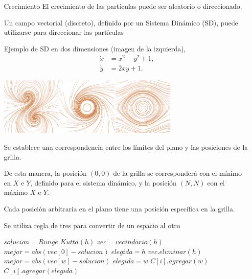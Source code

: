 \documentclass[spanish]{beamer}
\begin{document}
\begin{frame}{Crecimiento}
El crecimiento de las partículas puede ser aleatorio o direccionado.

Un campo vectorial (discreto), definido por un Sistema Dinámico (SD), puede utilizarse para direccionar las partículas 

Ejemplo de SD en dos dimensiones (imagen de la izquierda),
\begin{equation*} \label{eq:simple}  
  \begin{aligned}
    \dot{x} &= x^{2}-y^{2}+1,\\
    \dot{y} &= 2xy+1.
  \end{aligned}
\end{equation*}
  \centerline{\includegraphics[width=9cm]{../figures/Fig2}}
\end{frame}

\begin{frame}
Se establece una correspondencia entre los límites del plano y las posiciones de la grilla.

De esta manera, la posición $(0,0)$ de la grilla se corresponderá con el mínimo en $X$ e $Y$, definido para el sistema dinámico, y la posición $(N,N)$ con el máximo $X$ e $Y$.

Cada posición arbitraria en el plano tiene una posición específica en la grilla.

Se utiliza regla de tres para convertir de un espacio al otro

\end{frame}

\begin{frame}
\begin{algorithm}[H]
\begin{algorithmic}[1]
\STATE $solucion = Runge\_Kutta(h)$
\STATE $vec = vecindario(h)$
\STATE $mejor = abs(vec[0] - solucion)$
\STATE $elegida = h$
\STATE $vec.eliminar(h)$
        \STATE $mejor = abs(vec[w]-solucion)$
        \STATE $elegida = w$
    \ENDIF
        \STATE $C[i].agregar(w)$
    \ENDIF
\ENDFOR
\STATE $C[i].agregar(elegida)$
\end{algorithmic}
\end{algorithm}
\end{frame}
\end{document}
